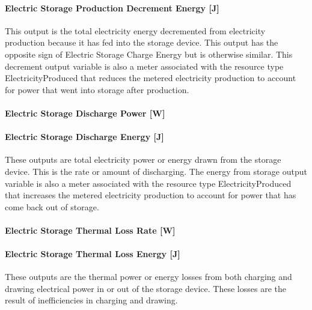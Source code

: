 \paragraph{Electric Storage Production Decrement Energy {[}J{]}}\label{electric-storage-production-decrement-energy-j}

This output is the total electricity energy decremented from electricity production because it has fed into the storage device. This output has the opposite sign of Electric Storage Charge Energy but is otherwise similar. This decrement output variable is also a meter associated with the resource type ElectricityProduced that reduces the metered electricity production to account for power that went into storage after production.

\paragraph{Electric Storage Discharge Power {[}W{]}}\label{electric-storage-discharge-power-w}

\paragraph{Electric Storage Discharge Energy {[}J{]}}\label{electric-storage-discharge-energy-j}

These outputs are total electricity power or energy drawn from the storage device. This is the rate or amount of discharging. The energy from storage output variable is also a meter associated with the resource type ElectricityProduced that increases the metered electricity production to account for power that has come back out of storage.

\paragraph{Electric Storage Thermal Loss Rate {[}W{]}}\label{electric-storage-thermal-loss-rate-w}

\paragraph{Electric Storage Thermal Loss Energy {[}J{]}}\label{electric-storage-thermal-loss-energy-j}

These outputs are the thermal power or energy losses from both charging and drawing electrical power in or out of the storage device. These losses are the result of inefficiencies in charging and drawing.

